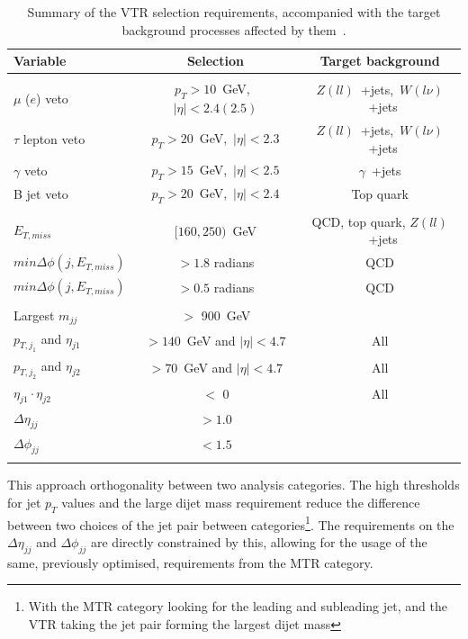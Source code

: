 \begin{table}[htbp]
\centering
\begin{tabular}{lcc}
    Variable                           & Selection                       & Target background \\
    \hline
     & & \\
    $\mu$ ($e$) veto               & $p_T > 10$~GeV,~$|\eta| < 2.4 (2.5)$  & $Z(ll)$~+jets,~$W(l\nu)$~+jets \\
    $\tau$ lepton veto                 & $p_T > 20$~GeV,~$|\eta| < 2.3$        & $Z(ll)$~+jets,~$W(l\nu)$~+jets  \\
    $\gamma$ veto                        & $p_T > 15$~GeV,~$|\eta| < 2.5$        & $\gamma$~+jets \\
    B jet veto                    &  $p_T > 20$~GeV,~$|\eta| < 2.4$  &  Top quark\\
        & & \\
    $E_{T,miss}$                          & $[160,250)$~GeV                          & QCD, top quark, $Z(ll)$~+jets \\
    $min\Delta\phi(j, E_{T,miss})$   &  $ {>} 1.8$ radians               & QCD \\
    $min\Delta\phi(j, E_{T,miss})$   &  $ {>} 0.5$ radians               & QCD \\
        & & \\
    Largest $m_{jj}$                               & ${>}$ 900~GeV  \\       
    $p_{T,j_1}$ and $\eta_{j1}$   & ${>} 140$~GeV and $ |\eta| < 4.7$      & All \\
    $p_{T,j_2}$ and $\eta_{j2}$   & ${>} 70$~GeV and $ |\eta| < 4.7$      & All \\
    $\eta_{j1}\cdot\eta_{j2}$   & ${<}$ 0   & All \\
    $\Delta\eta_{jj}$                            & ${>} 1.0$  \\
    $\Delta\phi_{jj}$                            & ${<} 1.5$  \\
      & & \\
         \hline
\end{tabular}
\caption{Summary of the VTR selection requirements, accompanied with the target background processes affected by them~\cite{note:AN_19_257}.}
\label{tab:selection_vtr}
\end{table}

\hspace{10pt} This approach orthogonality between two analysis categories. The high thresholds for jet $p_T$ values and the large dijet mass requirement reduce the difference between two choices of the jet pair between categories\footnote{With the MTR category looking for the leading and subleading jet, and the VTR taking the jet pair forming the largest dijet mass}. The requirements on the $\Delta\eta_{jj}$ and $\Delta\phi_{jj}$ are directly constrained by this, allowing for the usage of the same, previously optimised, requirements from the MTR category.

